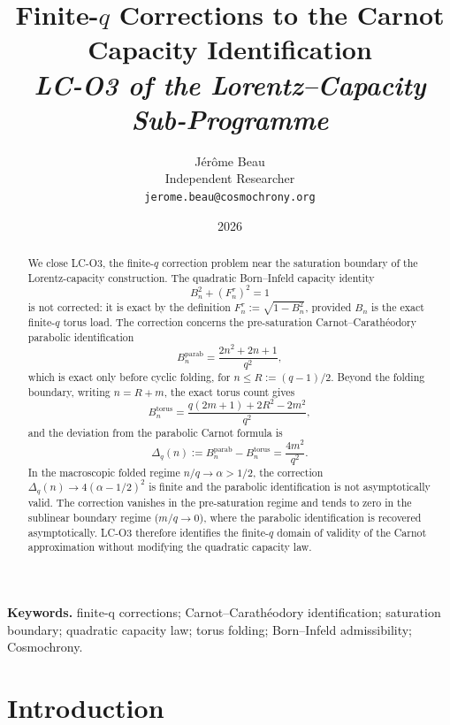 \documentclass[12pt,a4paper]{article}
\title{Finite-$q$ Corrections to the Carnot Capacity Identification\\[4pt]
\normalsize\itshape LC-O3 of the Lorentz--Capacity Sub-Programme}
\author{J\'er\^ome Beau\\[2pt]
\small Independent Researcher\\
\small \texttt{jerome.beau@cosmochrony.org}}
\date{2026}
\theoremstyle{remark}
\begin{document}
  \maketitle

  \begin{abstract}
    We close LC-O3, the finite-$q$ correction problem near the saturation boundary of the
    Lorentz-capacity construction.
    The quadratic Born--Infeld capacity identity
    \[
      B_n^2 + (F^\tau_n)^2 = 1
    \]
    is not corrected: it is exact by the definition $F^\tau_n := \sqrt{1-B_n^2}$, provided
    $B_n$ is the exact finite-$q$ torus load.
    The correction concerns the pre-saturation Carnot--Carath\'eodory parabolic
    identification
    \[
      B_n^{\mathrm{parab}} = \frac{2n^2+2n+1}{q^2},
    \]
    which is exact only before cyclic folding, for $n \leq R := (q-1)/2$.
    Beyond the folding boundary, writing $n = R+m$, the exact torus count gives
    \[
      B_n^{\mathrm{torus}} = \frac{q(2m+1)+2R^2-2m^2}{q^2},
    \]
    and the deviation from the parabolic Carnot formula is
    \[
      \Delta_q(n) := B_n^{\mathrm{parab}} - B_n^{\mathrm{torus}} = \frac{4m^2}{q^2}.
    \]
    In the macroscopic folded regime $n/q \to \alpha > 1/2$, the correction
    $\Delta_q(n) \to 4(\alpha - 1/2)^2$ is finite and the parabolic identification
    is not asymptotically valid.
    The correction vanishes in the pre-saturation regime and tends to zero in the sublinear boundary regime
    ($m/q \to 0$), where the parabolic identification is recovered asymptotically.
    LC-O3 therefore identifies the finite-$q$ domain of validity of the Carnot
    approximation without modifying the quadratic capacity law.
  \end{abstract}

  \medskip
  \noindent\textbf{Keywords.}
  finite-q corrections; Carnot--Carath\'eodory identification; saturation boundary;
  quadratic capacity law; torus folding; Born--Infeld admissibility; Cosmochrony.

  \newpage
  \tableofcontents

  \newpage
  \section{Introduction}
    \label{sec:introduction}
\end{document}
